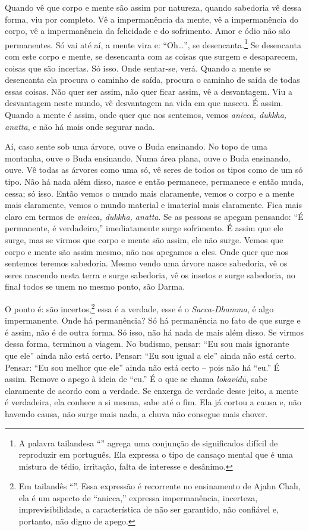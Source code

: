 Quando vê que corpo e mente são assim por natureza, quando sabedoria
vê dessa forma, viu por completo. Vê a impermanência da mente, vê a
impermanência do corpo, vê a impermanência da felicidade e do
sofrimento. Amor e ódio não são permanentes. Só vai até aí, a mente
vira e: “Oh\ldots{}”, se desencanta.\footnote{A palavra tailandesa
“” agrega uma conjunção de significados
difícil de reproduzir em português. Ela expressa o tipo de cansaço
mental que é uma mistura de tédio, irritação, falta de interesse e
desânimo.} Se desencanta com este corpo e mente, se desencanta com as
coisas que surgem e desaparecem, coisas que são incertas. Só isso. Onde
sentar-se, verá. Quando a mente se desencanta ela procura o caminho de
saída, procura o caminho de saída de todas essas coisas. Não quer ser
assim, não quer ficar assim, vê a desvantagem. Viu a desvantagem neste
mundo, vê desvantagem na vida em que nasceu. É assim. Quando a mente é
assim, onde quer que nos sentemos, vemos \emph{anicca, dukkha,
anatta}, e não há mais onde segurar nada. 

Aí, caso sente sob uma árvore, ouve o Buda ensinando. No topo de uma
montanha, ouve o Buda ensinando. Numa área plana, ouve o Buda
ensinando, ouve. Vê todas as árvores como uma só, vê seres de todos os
tipos como de um só tipo. Não há nada além disso, nasce e então
permanece, permanece e então muda, cessa; só isso. Então vemos o mundo
mais claramente, vemos o corpo e a mente mais claramente, vemos o mundo
material e imaterial mais claramente. Fica mais claro em
termos de \emph{anicca, dukkha, anatta}. Se as pessoas se apegam
pensando: “É permanente, é verdadeiro,” imediatamente surge sofrimento.
É assim que ele surge, mas se virmos que corpo e mente são assim, ele
não surge. Vemos que corpo e mente são assim mesmo, não nos apegamos a
eles. Onde quer que nos sentemos teremos sabedoria. Mesmo vendo uma
árvore nasce sabedoria, vê os seres nascendo nesta terra e surge
sabedoria, vê os insetos e surge sabedoria, no final todos se unem no
mesmo ponto, são Darma. 

O ponto é: são incertos,\footnote{Em tailandês
“”. Essa expressão é recorrente no
ensinamento de Ajahn Chah, ela é um aspecto de “anicca,” expressa
impermanência, incerteza, imprevisibilidade, a característica de não
ser garantido, não confiável e, portanto, não digno de apego.} essa é
a verdade, esse é o \emph{Sacca-Dhamma}, é algo impermanente. Onde há
permanência? Só há permanência no fato de que surge e é assim, não é de
outra forma. Só isso, não há nada de mais além disso. Se virmos dessa
forma, terminou a viagem. No budismo, pensar: “Eu sou mais ignorante
que ele” ainda não está certo. Pensar: “Eu sou igual a ele” ainda não
está certo. Pensar: “Eu sou melhor que ele” ainda não está certo – pois
não há “eu.” É assim. Remove o apego à ideia de “eu.” É o que se chama
\emph{lokavidū}, sabe claramente de acordo com a verdade. Se
enxerga de verdade desse jeito, a mente é verdadeira, ela conhece a si
mesma, sabe até o fim. Ela já cortou a causa e, não havendo causa, não
surge mais nada, a chuva não consegue mais chover.

